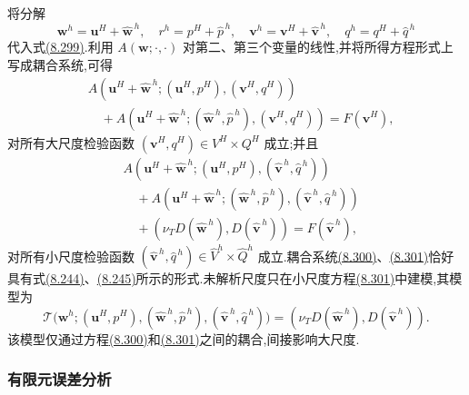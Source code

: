 \begin{note}[常数附加涡黏度下的等价形式]
将分解
\[
 \bm w^h=\bm u^H+\widehat{\bm w}^{\,h},\quad
 r^h=p^H+\widehat p^{\,h},\quad
 \bm v^h=\bm v^H+\widehat{\bm v}^{\,h},\quad
 q^h=q^H+\widehat q^{\,h}
\]
代入式\hyperref[eq:vms-coarse-projection-constant-form]{(8.299)}.利用 $A(\bm w;\cdot,\cdot)$ 对第二、第三个变量的线性,并将所得方程形式上写成耦合系统,可得
\begin{equation}\label{eq:vms-coarse-projection-large-equation}
\begin{aligned}
 &A(\bm u^H+\widehat{\bm w}^{\,h};
       (\bm u^H,p^H),(\bm v^H,q^H))\\
 &\quad+
 A(\bm u^H+\widehat{\bm w}^{\,h};
       (\widehat{\bm w}^{\,h},\widehat p^{\,h}),
       (\bm v^H,q^H))
 =F(\bm v^H),
\end{aligned}
\end{equation}
对所有大尺度检验函数 $(\bm v^H,q^H)\in V^H\times Q^H$ 成立;并且
\begin{equation}\label{eq:vms-coarse-projection-small-equation}
\begin{aligned}
 &A(\bm u^H+\widehat{\bm w}^{\,h};
       (\bm u^H,p^H),(\widehat{\bm v}^{\,h},\widehat q^{\,h}))\\
 &\quad+
 A(\bm u^H+\widehat{\bm w}^{\,h};
       (\widehat{\bm w}^{\,h},\widehat p^{\,h}),
       (\widehat{\bm v}^{\,h},\widehat q^{\,h}))\\
 &\quad+
 (\nu_TD(\widehat{\bm w}^{\,h}),D(\widehat{\bm v}^{\,h}))
 =F(\widehat{\bm v}^{\,h}),
\end{aligned}
\end{equation}
对所有小尺度检验函数 $(\widehat{\bm v}^{\,h},\widehat q^{\,h})\in
\widehat V^h\times\widehat Q^h$ 成立.耦合系统\hyperref[eq:vms-coarse-projection-large-equation]{(8.300)}、\hyperref[eq:vms-coarse-projection-small-equation]{(8.301)}恰好具有式\hyperref[eq:vms-three-scale-model-large]{(8.244)}、\hyperref[eq:vms-three-scale-model-small]{(8.245)}所示的形式.未解析尺度只在小尺度方程\hyperref[eq:vms-coarse-projection-small-equation]{(8.301)}中建模,其模型为
\[
 \mathcal T\bigl(\bm w^h;(\bm u^H,p^H),
     (\widehat{\bm w}^{\,h},\widehat p^{\,h}),
     (\widehat{\bm v}^{\,h},\widehat q^{\,h})\bigr)
 =(\nu_TD(\widehat{\bm w}^{\,h}),
      D(\widehat{\bm v}^{\,h})).
\]
该模型仅通过方程\hyperref[eq:vms-coarse-projection-large-equation]{(8.300)}和\hyperref[eq:vms-coarse-projection-small-equation]{(8.301)}之间的耦合,间接影响大尺度.
\end{note}

\subsubsection{有限元误差分析}
\label{subsubsec:vms-coarse-projection-error-analysis}

